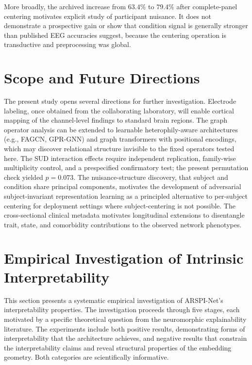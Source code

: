More broadly, the archived increase from $63.4\%$ to $79.4\%$ after complete-panel centering motivates explicit study of participant nuisance. It does not demonstrate a prospective gain or show that condition signal is generally stronger than published EEG accuracies suggest, because the centering operation is transductive and preprocessing was global.


\section{Scope and Future Directions}
\label{sec:ch5_scope}

The present study opens several directions for further investigation. Electrode labeling, once obtained from the collaborating laboratory, will enable cortical mapping of the channel-level findings to standard brain regions. The graph operator analysis can be extended to learnable heterophily-aware architectures (e.g., FAGCN, GPR-GNN) and graph transformers with positional encodings, which may discover relational structure invisible to the fixed operators tested here. The SUD interaction effects require independent replication, family-wise multiplicity control, and a prespecified confirmatory test; the present permutation check yielded $p = 0.073$. The nuisance-structure discovery, that subject and condition share principal components, motivates the development of adversarial subject-invariant representation learning as a principled alternative to per-subject centering for deployment settings where subject-centering is not possible. The cross-sectional clinical metadata motivates longitudinal extensions to disentangle trait, state, and comorbidity contributions to the observed network phenotypes.


\section{Empirical Investigation of Intrinsic Interpretability}
\label{sec:ch5_interpretability_investigation}

This section presents a systematic empirical investigation of ARSPI-Net's interpretability properties. The investigation proceeds through five stages, each motivated by a specific theoretical question from the neuromorphic explainability literature. The experiments include both positive results, demonstrating forms of interpretability that the architecture achieves, and negative results that constrain the interpretability claims and reveal structural properties of the embedding geometry. Both categories are scientifically informative.

